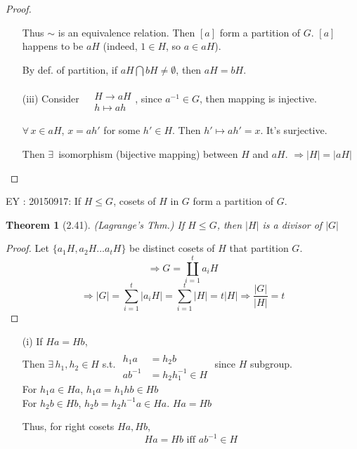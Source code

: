 \documentclass[twoside,landscape]{amsart}
\theoremstyle{plain}
\newtheorem{theorem}{Theorem}
\theoremstyle{definition}
\theoremstyle{remark}
\newcommand{\exercisehead}[1]
  { \smallskip
   \noindent{\small\bf Exercise #1.}
  }
\begin{document}
\begin{multicols*}{2}
\begin{proof}
\begin{enumerate}
Thus $\sim$ is an equivalence relation.  Then $[a]$ form a partition of $G$.  $[a]$ happens to be $aH$ (indeed, $1 \in H$, so $a\in aH$).  

By def. of partition, if $aH \bigcap bH \neq \emptyset$, then $aH = bH$.  
\item[(iii)] Consider $\begin{aligned} & \quad \\
  & H \to aH \\
  & h \mapsto ah \end{aligned}$, since $a^{-1} \in G$, then mapping is injective.  

$\forall \, x \in aH$, $x= ah'$ for some $h' \in H$. Then $h' \mapsto ah' =x$.  It's surjective.  

Then $\exists \, $ isomorphism (bijective mapping) between $H$ and $aH$.  $\Longrightarrow |H| = |aH|$
\end{enumerate}
\end{proof}

EY : 20150917: If $H \leq G$, cosets of $H$ in $G$ form a partition of $G$.  

\begin{theorem}[2.41](Lagrange's Thm.)
  If $H\leq G$, then $|H|$ is a divisor of $|G|$
\end{theorem}
\begin{proof}
  Let $\lbrace a_1 H, a_2 H \dots a_t H \rbrace$ be distinct cosets of $H$ that partition $G$.  
\[
\Longrightarrow G = \coprod_{i=1}^t a_i H
\]
\[
\Longrightarrow |G| = \sum_{i=1}^t |a_i H| = \sum_{i=1}^t |H| = t|H| \Longrightarrow \frac{|G|}{|H|} = t
\]
\end{proof}



\exercisehead{2.29} \begin{enumerate}
\item[(i)] If $Ha= Hb$, \\
Then $\exists \, h_1, h_2 \in H$ s.t. $\begin{aligned} & \quad \\
  h_1 a & = h_2 b \\ 
  ab^{-1} & = h_2 h_1^{-1} \in H \end{aligned}$ since $H$ subgroup.   \\

For $h_1 a \in Ha$, $h_1 a = h_1 h b \in Hb$ \\
For $h_2 b \in Hb$, $h_2 b = h_2 h^{-1} a \in Ha$.  $Ha = Hb$

Thus, for right cosets $Ha, Hb$, 
\[
Ha = Hb \text{ iff } ab^{-1} \in H
\]



\end{enumerate}
\end{multicols*}
\end{document}
